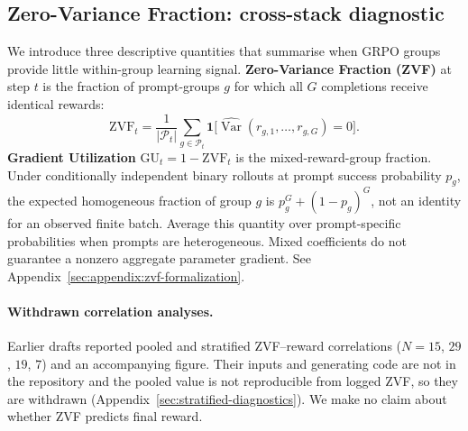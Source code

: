\documentclass{article}
\begin{document}
\subsection{Zero-Variance Fraction: cross-stack diagnostic}
\label{sec:zvf-analysis}

We introduce three descriptive quantities that summarise when GRPO groups
provide little within-group learning signal. \textbf{Zero-Variance
Fraction (ZVF)} at step $t$ is the fraction of prompt-groups $g$ for which
all $G$ completions receive identical rewards:
\[
  \mathrm{ZVF}_t = \frac{1}{|\mathcal{P}_t|}\sum_{g \in \mathcal{P}_t}
  \mathbf{1}\bigl[\widehat{\operatorname{Var}}(r_{g,1},\ldots,r_{g,G}) = 0\bigr].
\]
\textbf{Gradient Utilization} $\mathrm{GU}_t = 1 - \mathrm{ZVF}_t$ is the
mixed-reward-group fraction. Under conditionally independent binary
rollouts at prompt success probability $p_g$, the expected homogeneous fraction
of group $g$ is $p_g^G+(1-p_g)^G$, not an identity for an observed finite batch. Average this
quantity over prompt-specific probabilities when prompts are heterogeneous.
Mixed coefficients do not guarantee a nonzero aggregate parameter gradient.
See Appendix~\ref{sec:appendix:zvf-formalization}.

\paragraph{Withdrawn correlation analyses.}
Earlier drafts reported pooled and stratified ZVF--reward correlations
($N{=}15$, $29$, $19$, $7$) and an accompanying figure. Their inputs and
generating code are not in the repository and the pooled value is not
reproducible from logged ZVF, so they are withdrawn
(Appendix~\ref{sec:stratified-diagnostics}). We make no claim about whether
ZVF predicts final reward.
\end{document}

